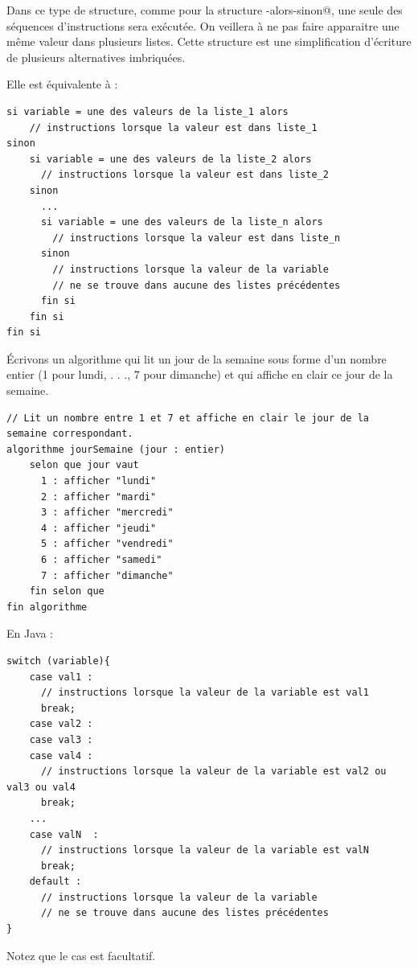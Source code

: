 \documentclass[11pt,a4paper]{article}
\begin{document}
        Dans ce type de structure, comme pour la structure \verb@si-alors-sinon@, une seule des s\'equences
        d'instructions sera ex\'ecut\'ee. On veillera \`a ne pas faire apparaitre une m\^eme valeur dans
        plusieurs listes. Cette structure est une simplification d'\'ecriture de plusieurs alternatives
        imbriqu\'ees.
      
            \par
        
        Elle est \'equivalente \`a : 
      
            \par
        \begin{verbatim}
si variable = une des valeurs de la liste_1 alors
    // instructions lorsque la valeur est dans liste_1
sinon
    si variable = une des valeurs de la liste_2 alors
      // instructions lorsque la valeur est dans liste_2
    sinon
      ...
      si variable = une des valeurs de la liste_n alors
        // instructions lorsque la valeur est dans liste_n
      sinon
        // instructions lorsque la valeur de la variable
        // ne se trouve dans aucune des listes précédentes
      fin si
    fin si
fin si
      \end{verbatim}
        \'Ecrivons un algorithme qui lit un jour de la semaine sous forme d'un nombre entier (1 pour
        lundi, . . ., 7 pour dimanche) et qui affiche en clair ce jour de la semaine.
      
            \par
        \begin{verbatim}
// Lit un nombre entre 1 et 7 et affiche en clair le jour de la semaine correspondant.
algorithme jourSemaine (jour : entier)
    selon que jour vaut
      1 : afficher "lundi"
      2 : afficher "mardi"
      3 : afficher "mercredi"
      4 : afficher "jeudi"
      5 : afficher "vendredi"
      6 : afficher "samedi"
      7 : afficher "dimanche"
    fin selon que
fin algorithme
    \end{verbatim}En Java :
            \par
        \begin{verbatim}
switch (variable){
    case val1 :
      // instructions lorsque la valeur de la variable est val1
      break;
    case val2 :
    case val3 :
    case val4 :
      // instructions lorsque la valeur de la variable est val2 ou val3 ou val4
      break;
    ...
    case valN  :
      // instructions lorsque la valeur de la variable est valN
      break;
    default :
      // instructions lorsque la valeur de la variable
      // ne se trouve dans aucune des listes précédentes
}
      \end{verbatim}Notez que le cas \verb@default@ est facultatif.
            \par
        
\end{document}
